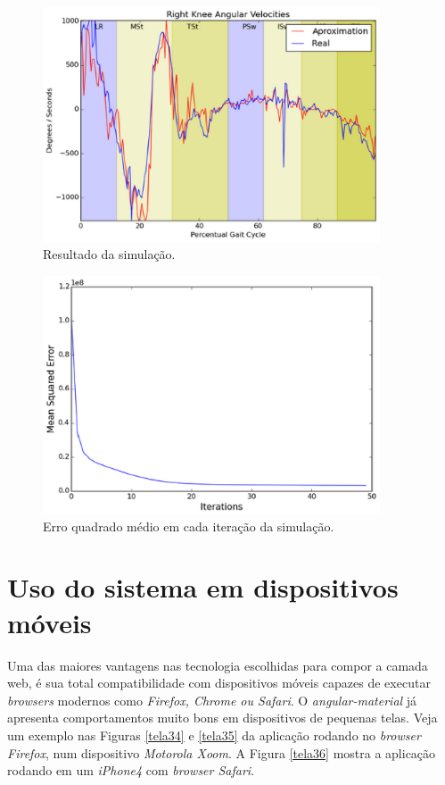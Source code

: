 \begin{figure}[H]
	\centering
	\includegraphics[width=10cm]{figuras/tela32.eps}
	\caption{Resultado da simulação.}
\label{tela32}
\end{figure}

\begin{figure}[H]
	\centering
	\includegraphics[width=10cm]{figuras/tela33.eps}
	\caption{Erro quadrado médio em cada iteração da simulação.}
\label{tela33}
\end{figure}

\section{Uso do sistema em dispositivos móveis}
Uma das maiores vantagens nas tecnologia escolhidas para compor a camada web, é sua total compatibilidade com dispositivos móveis capazes de executar \emph{browsers} modernos como \emph{Firefox, Chrome ou Safari}. O \emph{angular-material} já apresenta comportamentos muito bons em dispositivos de pequenas telas. 
Veja um exemplo nas Figuras \ref{tela34} e \ref{tela35} da aplicação rodando no \emph{browser} \emph{Firefox}, num dispositivo \emph{Motorola Xoom}. A Figura \ref{tela36} mostra a aplicação rodando em um \emph{iPhone4} com \emph{browser Safari}.

